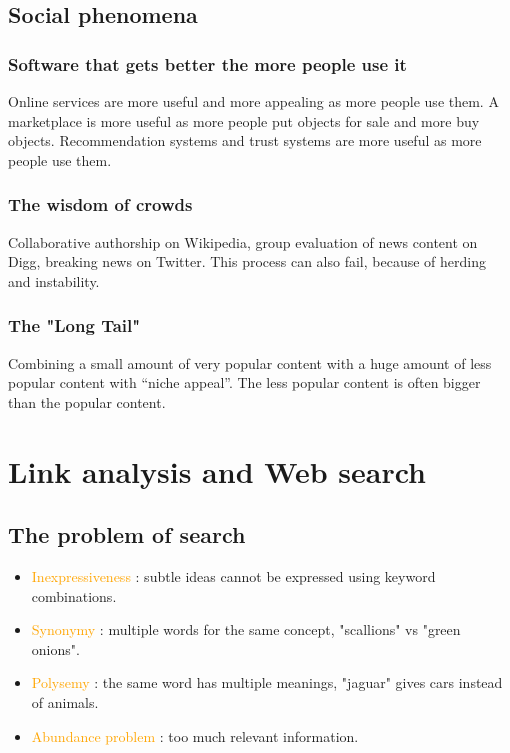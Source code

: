 \subsection{Social phenomena}

\subsubsection{Software that gets better the more people use it}

Online services are more useful and more appealing as more people use them. A marketplace is more useful as more people put objects for sale and more buy objects. Recommendation systems and trust systems are more useful as more people use them.

\subsubsection{The wisdom of crowds}

Collaborative authorship on Wikipedia, group evaluation of news content on Digg, breaking news on Twitter. This process can also fail, because of herding and instability.

\subsubsection{The "Long Tail"}

Combining a small amount of very popular content with a huge amount of less popular content with “niche appeal”. The less popular content is often bigger than the popular content.

\section{Link analysis and Web search}

\subsection{The problem of search}

\begin{itemize}
\item \textcolor{orange}{Inexpressiveness} : subtle ideas cannot be expressed using keyword combinations.
\item \textcolor{orange}{Synonymy} : multiple words for the same concept, "scallions" vs "green onions".
\item \textcolor{orange}{Polysemy} : the same word has multiple meanings, "jaguar" gives cars instead of animals.
\item \textcolor{orange}{Abundance problem} : too much relevant information.
\end{itemize}

